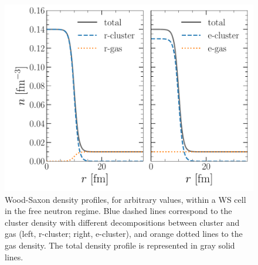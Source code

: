 \begin{figure}[!t]
\begin{center}
  \includegraphics[width=0.9\linewidth]{figures/clustering.pdf}
\end{center}
\caption[{r-cluster and e-cluster representations}]{{Wood-Saxon 
    density profiles, for arbitrary values, within a WS cell in the free 
neutron regime. Blue dashed lines correspond to the cluster density with
different decompositions between cluster and gas (left,
r-cluster; right, e-cluster), and orange dotted lines to the gas density. The
total density profile is represented in gray solid lines.}}\label{fig:clustering}
\end{figure}

